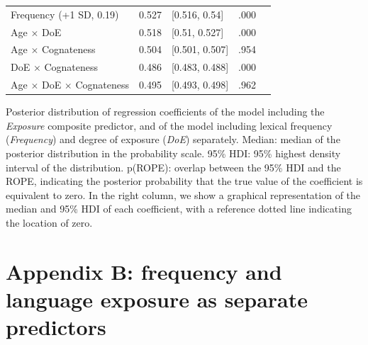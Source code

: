 \documentclass[
]{article}
\begin{document}
\begin{table}
\begin{minipage}[t]{\linewidth}
{\begin{tabular}{lclrl}
\hspace{1em}Frequency (+1 SD, 0.19) & 0.527 & {}[0.516, 0.54] & .000 & \\
\hspace{1em}Age $\times$ DoE & 0.518 & {}[0.51, 0.527] & .000 & \\
\hspace{1em}Age $\times$ Cognateness & 0.504 & {}[0.501, 0.507] & .954 & \\
\hspace{1em}DoE $\times$ Cognateness & 0.486 & {}[0.483, 0.488] & .000 & \\
\hspace{1em}Age $\times$ DoE $\times$ Cognateness & 0.495 & {}[0.493, 0.498] & .962 & \\
\bottomrule
\end{tabular}

}

\end{minipage}%
\newline
\begin{minipage}[t]{\linewidth}

{\centering 

Posterior distribution of regression coefficients of the model including
the \emph{Exposure} composite predictor, and of the model including
lexical frequency (\emph{Frequency}) and degree of exposure (\emph{DoE})
separately. Median: median of the posterior distribution in the
probability scale. 95\% HDI: 95\% highest density interval of the
distribution. p(ROPE): overlap between the 95\% HDI and the ROPE,
indicating the posterior probability that the true value of the
coefficient is equivalent to zero. In the right column, we show a
graphical representation of the median and 95\% HDI of each coefficient,
with a reference dotted line indicating the location of zero.

}

\end{minipage}%

\end{table}

\newpage{}

\hypertarget{appendix-b-frequency-and-language-exposure-as-separate-predictors}{%
\section*{Appendix B: frequency and language exposure as separate
predictors}\label{appendix-b-frequency-and-language-exposure-as-separate-predictors}}
\end{document}
